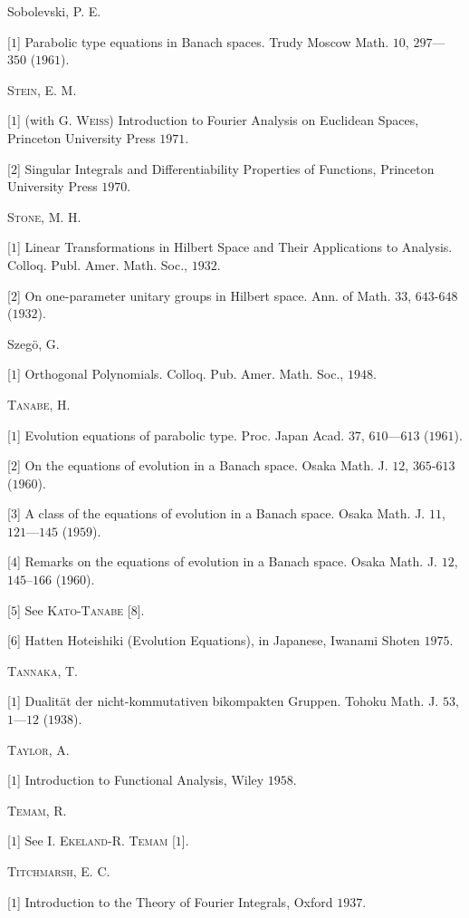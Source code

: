 Sobolevski, P. E. 

[$1$] Parabolic type equations in Banach spaces. Trudy Moscow Math. $10$, $297$---$350$ ($1961$). 

\textsc{Stein}, E. M. 

[$1$] (with G. \textsc{Weiss}) Introduction to Fourier Analysis on Euclidean Spaces, Princeton University Press $1971$. 

[$2$] Singular Integrals and Differentiability Properties of Functions, Princeton University Press $1970$. 

\textsc{Stone}, M. H. 

[$1$] Linear Transformations in Hilbert Space and Their Applications to Analysis. Colloq. Publ. Amer. Math. Soc., $1932$. 

[$2$] On one-parameter unitary groups in Hilbert space. Ann. of Math. $33$, $643$-$648$ ($1932$). 

Szegö, G. 

[$1$] Orthogonal Polynomials. Colloq. Pub. Amer. Math. Soc., $1948$. 

\textsc{Tanabe}, H. 

[$1$] Evolution equations of parabolic type. Proc. Japan Acad. $37$, $610$---$613$ ($1961$). 

[$2$] On the equations of evolution in a Banach space. Osaka Math. J. $12$, $365$-$613$ ($1960$). 

[$3$] A class of the equations of evolution in a Banach space. Osaka Math. J. $11$, $121$---$145$ ($1959$). 

[$4$] Remarks on the equations of evolution in a Banach space. Osaka Math. J. $12$, $145$--$166$ ($1960$). 

[$5$] See \textsc{Kato}-\textsc{Tanabe} [$8$]. 

[$6$] Hatten Hoteishiki (Evolution Equations), in Japanese, Iwanami Shoten $1975$. 

\textsc{Tannaka}, T. 

[$1$] Dualität der nicht-kommutativen bikompakten Gruppen. Tohoku Math. J. $53$, $1$---$12$ ($1938$). 

\textsc{Taylor}, A. 

[$1$] Introduction to Functional Analysis, Wiley $1958$. 

\textsc{Temam}, R. 

[$1$] See I. \textsc{Ekeland}-R. \textsc{Temam} [$1$]. 

\textsc{Titchmarsh}, E. C. 

[$1$] Introduction to the Theory of Fourier Integrals, Oxford $1937$. 

